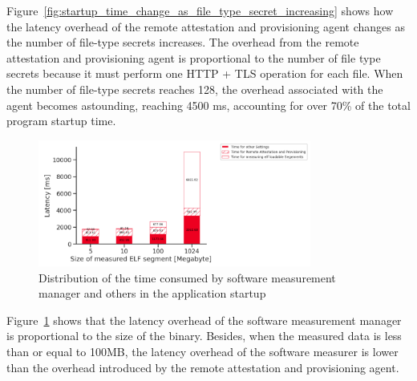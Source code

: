 Figure~\ref{fig:startup_time_change_as_file_type_secret_increasing} shows how the latency overhead of the remote attestation and provisioning agent changes as the number of file-type secrets increases. The overhead from the remote attestation and provisioning agent is proportional to the 
number of file type secrets because it must perform one HTTP + TLS operation for each file. When the number of file-type secrets reaches 128, the overhead associated with the agent becomes astounding, reaching 4500 ms, accounting for over 70\% of the total program startup time.
\begin{figure}[!htb]
    \centering
    \includegraphics[width=0.8\textwidth]{images/startup_time_change_as_elf_size_increasing.PNG}
    \caption[Distribution of the time consumed by software measurement manager and others in the Application Startup]{Distribution of the time consumed by software measurement manager and others in the application startup}
    \label{fig:startup_time_change_as_elf_size_increasing}
\end{figure}


Figure~\ref{fig:startup_time_change_as_elf_size_increasing} shows that the latency overhead of the software measurement manager is proportional to the size of the binary. Besides, when the measured data is less than or equal to 100MB, the latency overhead of the software measurer is lower than the 
overhead introduced by the remote attestation and provisioning agent.










